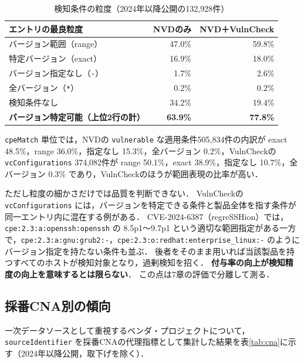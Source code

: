 \begin{table}[htbp]
  \caption{検知条件の粒度（2024年以降公開の132,928件）}
  \label{tab:gran}
  \begin{center}
  \small
  \begin{tabular}{lrr}
    \hline
    エントリの最良粒度 & NVDのみ & NVD＋VulnCheck \\
    \hline
    バージョン範囲（range） & 47.0\% & 59.8\% \\
    特定バージョン（exact） & 16.9\% & 18.0\% \\
    バージョン指定なし（\texttt{-}） & 1.7\% & 2.6\% \\
    全バージョン（\texttt{*}） & 0.2\% & 0.2\% \\
    検知条件なし & 34.2\% & 19.4\% \\
    \hline
    \textbf{バージョン特定可能（上位2行の計）} & \textbf{63.9\%} & \textbf{77.8\%} \\
    \hline
  \end{tabular}
  \end{center}
\end{table}

\texttt{cpeMatch} 単位では，NVDの \texttt{vulnerable} な適用条件505,834件の内訳が exact 48.5\%，range 36.0\%，指定なし 15.3\%，全バージョン 0.2\%，VulnCheckの \texttt{vcConfigurations} 374,082件が range 50.1\%，exact 38.9\%，指定なし 10.7\%，全バージョン 0.3\% であり，VulnCheckのほうが範囲表現の比率が高い．

ただし粒度の細かさだけでは品質を判断できない．
VulnCheckの \texttt{vcConfigurations} には，バージョンを特定できる条件と製品全体を指す条件が同一エントリ内に混在する例がある．
CVE-2024-6387（regreSSHion）では，\texttt{cpe:2.3:a:openssh:openssh} の 8.5p1〜9.7p1 という適切な範囲指定がある一方で，\texttt{cpe:2.3:a:gnu:grub2:-}，\texttt{cpe:2.3:o:redhat:enterprise\_linux:-} のようにバージョン指定を持たない条件も並ぶ．
後者をそのまま用いれば当該製品を持つすべてのホストが検知対象となり，過剰検知を招く．
\textbf{付与率の向上が検知精度の向上を意味するとは限らない}．
この点は7章の評価で分離して測る．

\subsection*{採番CNA別の傾向}

一次データソースとして重視するベンダ・プロジェクトについて，\texttt{sourceIdentifier} を採番CNAの代理指標として集計した結果を表\ref{tab:cna}に示す（2024年以降公開，取下げを除く）．

